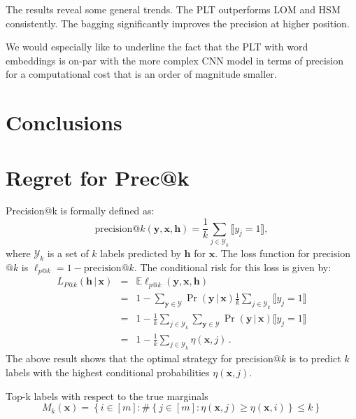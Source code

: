 \documentclass{article}
\renewcommand{\vec}[1]{\boldsymbol{#1}}
\newcommand{\bx}{\vec{x}}
\newcommand{\by}{\vec{y}}
\newcommand{\bh}{\vec{h}}
\newcommand{\calY}{\mathcal{Y}}
\newcommand{\loss}{L}
\newcommand{\assert}[1]{\llbracket #1 \rrbracket}
\newcommand{\given}{\, | \,}
\begin{document}
The results reveal some general trends. The PLT outperforms LOM and HSM consistently. The bagging significantly improves the precision at higher position. 

We would especially like to underline the fact that the PLT with word embeddings is on-par with the more complex CNN model in terms of precision for a computational cost that is an order of magnitude smaller.


\section{Conclusions}


\newpage






\appendix

\onecolumn

\section{Regret for Prec@k}


Precision@k is formally defined as:
\begin{equation}
\mathrm{precision}@k(\by, \bx, \bh) = \frac{1}{k} \sum_{j \in \calY_k} \assert{y_j = 1},
\label{eqn:precision-at-k}
\end{equation}
where $\calY_k$ is a set of $k$ labels predicted by $\bh$ for $\bx$.
%
The loss function for precision$@k$ is $\ell_{p@k} = 1 - \mathrm{precision}@k$. The conditional risk for this loss is given by:
\begin{eqnarray*}
\loss_{P@k}(\bh \given \bx) & = & \mathbb{E} \ell_{p@k}(\by,\bx, \bh) \\
& = & 1 - \sum_{\by \in \calY} \Pr(\by \given \bx) \frac{1}{k} \sum_{j \in \calY_k} \assert{y_j = 1} \\
& = & 1 - \frac{1}{k} \sum_{j \in \calY_k} \sum_{\by \in \calY} \Pr(\by \given \bx) \assert{y_j = 1} \\
& = & 1 - \frac{1}{k} \sum_{j \in \calY_k} \eta(\bx,j) \,.
\end{eqnarray*}
%
The above result shows that the optimal strategy for precision$@k$ is to predict $k$ labels
with the highest conditional probabilities $\eta(\bx,j)$.


Top-k labels with respect to the true marginals
\[
M_k(\bx) = \left\{ i\in [m] : \# \left\{ j \in [m] : \eta(\bx, j) \ge \eta(\bx, i)  \right\} \le k\right\}
\]
\end{document}
